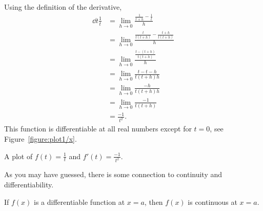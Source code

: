 \begin{solution}
Using the definition of the derivative,
\begin{align*}
\dd{t}\frac{1}{t}&=\lim_{ h\to0}\frac{\frac{1}{t+ h} - \frac{1}{t}}{h} \\
&=\lim_{h\to0}\frac{\frac{t}{t(t+ h)} - \frac{t+ h}{t(t+ h)}}{h} \\
&=\lim_{h\to0}\frac{\frac{t-(t+ h)}{t(t+ h)}}{h} \\
&=\lim_{h\to0}\frac{t-t- h}{t(t+ h) h} \\
&=\lim_{h\to0}\frac{- h}{t(t+ h) h} \\
&=\lim_{h\to0}\frac{-1}{t(t+ h)}\\
&=\frac{-1}{t^2}.
\end{align*}
This function is differentiable at all real numbers except for $t=0$, see Figure~\ref{figure:plot1/x}.
\end{solution}
\begin{marginfigure}
\caption{A plot of $f(t) = \frac{1}{t}$ and $f'(t) = \frac{-1}{t^2}$.}
\label{figure:plot1/x}
\end{marginfigure}


As you may have guessed, there is some connection to continuity and
differentiability. 



\begin{mainTheorem}\label{theorem:diff-cont}
If $f(x)$ is a differentiable function at $x = a$, then $f(x)$ is
continuous at $x=a$.
\end{mainTheorem}

